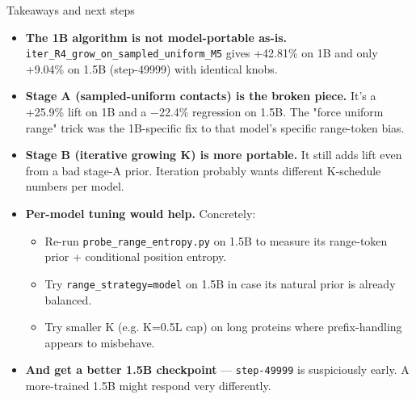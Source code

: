 \documentclass[aspectratio=169,11pt]{beamer}
\newcommand{\code}[1]{\texttt{\small\color{navy}#1}}
\newcommand{\codeS}[1]{\texttt{\scriptsize\color{navy}#1}}
\begin{document}
\begin{frame}{Takeaways and next steps}
  \begin{itemize}
    \setlength\itemsep{0.3em}
    \item \textbf{The 1B algorithm is not model-portable as-is.}
      \codeS{iter\_R4\_grow\_on\_sampled\_uniform\_M5} gives +42.81\%
      on 1B and only +9.04\% on 1.5B (step-49999) with identical knobs.
    \item \textbf{Stage A (sampled-uniform contacts) is the broken
      piece.} It's a +25.9\% lift on 1B and a $-$22.4\% regression on
      1.5B. The "force uniform range" trick was the 1B-specific fix
      to that model's specific range-token bias.
    \item \textbf{Stage B (iterative growing K) is more portable.}
      It still adds lift even from a bad stage-A prior. Iteration
      probably wants different K-schedule numbers per model.
    \item \textbf{Per-model tuning would help.} Concretely:
      \begin{itemize}
        \setlength\itemsep{0.1em}
        \item Re-run \codeS{probe\_range\_entropy.py} on 1.5B to measure
              its range-token prior + conditional position entropy.
        \item Try \code{range\_strategy=model} on 1.5B in case its
              natural prior is already balanced.
        \item Try smaller K (e.g. K=0.5L cap) on long proteins where
              prefix-handling appears to misbehave.
      \end{itemize}
    \item \textbf{And get a better 1.5B checkpoint} — \codeS{step-49999}
      is suspiciously early. A more-trained 1.5B might respond very
      differently.
  \end{itemize}
\end{frame}
\end{document}
